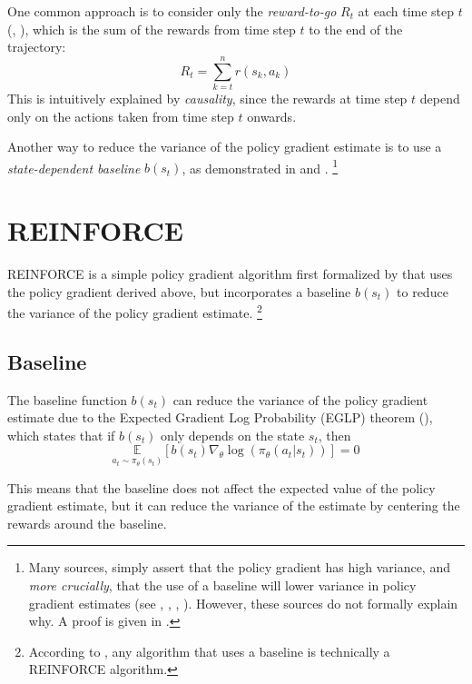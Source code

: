\documentclass{article} %
\begin{document}
One common approach is to consider only the \textit{reward-to-go} $R_t$ at each time step $t$ (\cite{SpinningUp-2018}, \cite{Levine-et-al-2023}),
which is the sum of the rewards from time step $t$ to the end of the trajectory:
\begin{equation} \label{reward_to_go}
    R_t = \sum_{k=t}^{n} r(s_k, a_k)
\end{equation}
This is intuitively explained by \textit{causality}, since the rewards at time step $t$ depend only on the actions taken from time step $t$ onwards.

Another way to reduce the variance of the policy gradient estimate is to use a \textit{state-dependent baseline} $b(s_t)$,
as demonstrated in \cite{SpinningUp-2018} and \cite{Williams-1992}.
\footnote{Many sources, simply assert that the policy gradient has high variance, 
and \textit{more crucially}, that the use of a baseline will lower variance in policy gradient estimates 
(see \cite{Weng-2018}, \cite{SpinningUp-2018}, \cite{Takeshi-2017}, \cite{Sutton-and-Barto-1998}).
However, these sources do not formally explain why. A proof is given in \cite{Wu-et-al-2018}.
}

\section{REINFORCE}
REINFORCE is a simple policy gradient algorithm first formalized by \cite{Williams-1992} that uses the policy gradient derived above,
but incorporates a baseline $b(s_t)$ to reduce the variance of the policy gradient estimate. \footnote{
    According to \cite{Williams-1992}, any algorithm that uses a baseline is technically a REINFORCE algorithm.
}

\subsection{Baseline}
The baseline function $b(s_t)$ can reduce the variance of the policy gradient estimate
due to the Expected Gradient Log Probability (EGLP) theorem (\cite{SpinningUp-2018}), which states that
if $b(s_t)$ only depends on the state $s_t$, then
\begin{equation} \label{eglp}
    \underset{a_t \sim \pi_\theta(s_t)}{\mathbb{E}} \left[ b(s_t)\nabla_\theta \log(\pi_\theta(a_t | s_t)) \right] = 0
\end{equation}

This means that the baseline does not affect the expected value of the policy gradient estimate,
but it can reduce the variance of the estimate by centering the rewards around the baseline.
\end{document}
